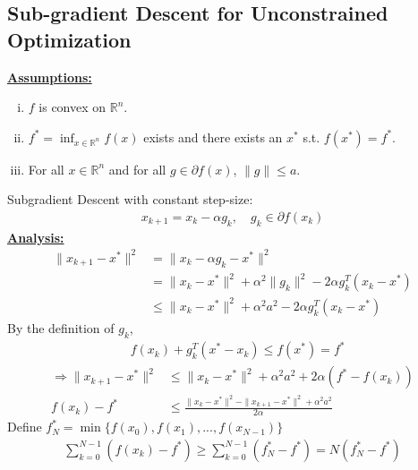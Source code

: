 \documentclass[11pt,a4paper]{article}
\begin{document}
\subsection{Sub-gradient Descent for Unconstrained Optimization}
\textbf{\underline{Assumptions:}}
\begin{enumerate}[(i)]
    \item $f$ is convex on $\mathbb{R}^n$.
    \item $f^*=\inf_{x\in \mathbb{R}^n}f(x)$ exists and there exists an $x^*$ s.t. $f(x^*)=f^*$.
    \item For all $x\in \mathbb{R}^n$ and for all $g\in \partial f(x)$, $\|g\|\leq a$.
\end{enumerate}
Subgradient Descent with constant step-size:
\begin{equation}
    \begin{aligned}
        x_{k+1}=x_k-\alpha g_k,\quad g_k\in \partial f(x_k)
    \end{aligned}
    \nonumber
\end{equation}
\textbf{\underline{Analysis:}}
\begin{equation}
    \begin{aligned}
        \|x_{k+1}-x^*\|^2&=\|x_k-\alpha g_k-x^*\|^2\\
        &=\|x_k-x^*\|^2+\alpha^2\|g_k\|^2-2\alpha g_k^T(x_k-x^*)\\
        &\leq \|x_k-x^*\|^2+\alpha^2a^2-2\alpha g_k^T(x_k-x^*)
    \end{aligned}
    \nonumber
\end{equation}
By the definition of $g_k$,
\begin{equation}
    \begin{aligned}
        &f(x_k)+g_k^T(x^*-x_k)\leq f(x^*)=f^*
    \end{aligned}
    \nonumber
\end{equation}
\begin{equation}
    \begin{aligned}
        \Rightarrow  \|x_{k+1}-x^*\|^2&\leq \|x_k-x^*\|^2+\alpha^2a^2+2\alpha (f^*-f(x_k))\\
        f(x_k)-f^*&\leq \frac{\|x_k-x^*\|^2-\|x_{k+1}-x^*\|^2+\alpha^2a^2}{2\alpha}
    \end{aligned}
    \nonumber
\end{equation}
Define $f_N^*=\min\{f(x_0),f(x_1),...,f(x_{N-1})\}$
\begin{equation}
    \begin{aligned}
        \sum_{k=0}^{N-1}(f(x_k)-f^*)\geq \sum_{k=0}^{N-1}(f_N^*-f^*)=N(f_N^*-f^*)
    \end{aligned}
    \nonumber
\end{equation}
\end{document}
